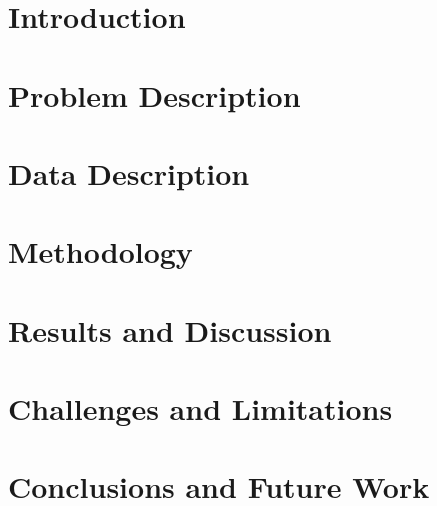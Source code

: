 \section{Introduction}
\label{sec:introduction}


\section{Problem Description}
\label{sec:problem-description}


\section{Data Description}
\label{sec:data-description}


\section{Methodology}
\label{sec:methodology}


\section{Results and Discussion}
\label{sec:results-and-discussion}


\section{Challenges and Limitations}
\label{sec:challenges-and-limitations}


\section{Conclusions and Future Work}
\label{sec:conclusions-and-future-work}
